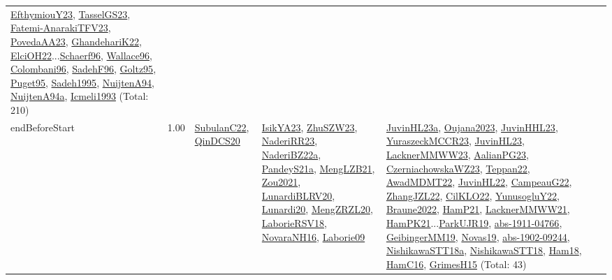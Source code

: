 {\begin{longtable}{p{3cm}r>{\raggedright\arraybackslash}p{6cm}>{\raggedright\arraybackslash}p{6cm}>{\raggedright\arraybackslash}p{8cm}}
\hyperref[detail:EfthymiouY23]{EfthymiouY23}, \hyperref[detail:TasselGS23]{TasselGS23}, \hyperref[detail:Fatemi-AnarakiTFV23]{Fatemi-AnarakiTFV23}, \hyperref[detail:PovedaAA23]{PovedaAA23}, \hyperref[detail:GhandehariK22]{GhandehariK22}, \hyperref[detail:ElciOH22]{ElciOH22}...\hyperref[detail:Schaerf96]{Schaerf96}, \hyperref[detail:Wallace96]{Wallace96}, \hyperref[detail:Colombani96]{Colombani96}, \hyperref[detail:SadehF96]{SadehF96}, \hyperref[detail:Goltz95]{Goltz95}, \hyperref[detail:Puget95]{Puget95}, \hyperref[detail:Sadeh1995]{Sadeh1995}, \hyperref[detail:NuijtenA94]{NuijtenA94}, \hyperref[detail:NuijtenA94a]{NuijtenA94a}, \hyperref[detail:Icmeli1993]{Icmeli1993} (Total: 210)\\
\index{endBeforeStart}\index{Constraints!endBeforeStart}endBeforeStart &  1.00 & \hyperref[detail:SubulanC22]{SubulanC22}, \hyperref[detail:QinDCS20]{QinDCS20} & \hyperref[detail:IsikYA23]{IsikYA23}, \hyperref[detail:ZhuSZW23]{ZhuSZW23}, \hyperref[detail:NaderiRR23]{NaderiRR23}, \hyperref[detail:NaderiBZ22a]{NaderiBZ22a}, \hyperref[detail:PandeyS21a]{PandeyS21a}, \hyperref[detail:MengLZB21]{MengLZB21}, \hyperref[detail:Zou2021]{Zou2021}, \hyperref[detail:LunardiBLRV20]{LunardiBLRV20}, \hyperref[detail:Lunardi20]{Lunardi20}, \hyperref[detail:MengZRZL20]{MengZRZL20}, \hyperref[detail:LaborieRSV18]{LaborieRSV18}, \hyperref[detail:NovaraNH16]{NovaraNH16}, \hyperref[detail:Laborie09]{Laborie09} & \hyperref[detail:JuvinHL23a]{JuvinHL23a}, \hyperref[detail:Oujana2023]{Oujana2023}, \hyperref[detail:JuvinHHL23]{JuvinHHL23}, \hyperref[detail:YuraszeckMCCR23]{YuraszeckMCCR23}, \hyperref[detail:JuvinHL23]{JuvinHL23}, \hyperref[detail:LacknerMMWW23]{LacknerMMWW23}, \hyperref[detail:AalianPG23]{AalianPG23}, \hyperref[detail:CzerniachowskaWZ23]{CzerniachowskaWZ23}, \hyperref[detail:Teppan22]{Teppan22}, \hyperref[detail:AwadMDMT22]{AwadMDMT22}, \hyperref[detail:JuvinHL22]{JuvinHL22}, \hyperref[detail:CampeauG22]{CampeauG22}, \hyperref[detail:ZhangJZL22]{ZhangJZL22}, \hyperref[detail:CilKLO22]{CilKLO22}, \hyperref[detail:YunusogluY22]{YunusogluY22}, \hyperref[detail:Braune2022]{Braune2022}, \hyperref[detail:HamP21]{HamP21}, \hyperref[detail:LacknerMMWW21]{LacknerMMWW21}, \hyperref[detail:HamPK21]{HamPK21}...\hyperref[detail:ParkUJR19]{ParkUJR19}, \hyperref[detail:abs-1911-04766]{abs-1911-04766}, \hyperref[detail:GeibingerMM19]{GeibingerMM19}, \hyperref[detail:Novas19]{Novas19}, \hyperref[detail:abs-1902-09244]{abs-1902-09244}, \hyperref[detail:NishikawaSTT18a]{NishikawaSTT18a}, \hyperref[detail:NishikawaSTT18]{NishikawaSTT18}, \hyperref[detail:Ham18]{Ham18}, \hyperref[detail:HamC16]{HamC16}, \hyperref[detail:GrimesH15]{GrimesH15} (Total: 43)\\

\end{longtable}}

